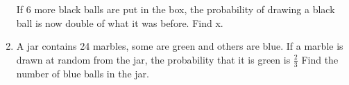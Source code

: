 \begin{enumerate}[label=\arabic*.,ref=\thesubsection.\theenumi]
If 6 more black balls are put in the box, the probability of drawing a black ball is now double of what it was before. Find x.
\\
\solution

\item A jar contains 24 marbles, some are green and others are blue. If a marble is drawn at random from the jar, the probability that it is green is $\frac{2}{3}$ Find the number of blue balls in the jar.
    \end{enumerate}
%
    

